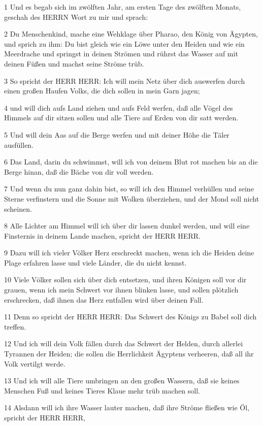 \par 1 Und es begab sich im zwölften Jahr, am ersten Tage des zwölften Monats, geschah des HERRN Wort zu mir und sprach:
\par 2 Du Menschenkind, mache eine Wehklage über Pharao, den König von Ägypten, und sprich zu ihm: Du bist gleich wie ein Löwe unter den Heiden und wie ein Meerdrache und springst in deinen Strömen und rührst das Wasser auf mit deinen Füßen und machst seine Ströme trüb.
\par 3 So spricht der HERR HERR: Ich will mein Netz über dich auswerfen durch einen großen Haufen Volks, die dich sollen in mein Garn jagen;
\par 4 und will dich aufs Land ziehen und aufs Feld werfen, daß alle Vögel des Himmels auf dir sitzen sollen und alle Tiere auf Erden von dir satt werden.
\par 5 Und will dein Aas auf die Berge werfen und mit deiner Höhe die Täler ausfüllen.
\par 6 Das Land, darin du schwimmst, will ich von deinem Blut rot machen bis an die Berge hinan, daß die Bäche von dir voll werden.
\par 7 Und wenn du nun ganz dahin bist, so will ich den Himmel verhüllen und seine Sterne verfinstern und die Sonne mit Wolken überziehen, und der Mond soll nicht scheinen.
\par 8 Alle Lichter am Himmel will ich über dir lassen dunkel werden, und will eine Finsternis in deinem Lande machen, spricht der HERR HERR.
\par 9 Dazu will ich vieler Völker Herz erschreckt machen, wenn ich die Heiden deine Plage erfahren lasse und viele Länder, die du nicht kennst.
\par 10 Viele Völker sollen sich über dich entsetzen, und ihren Königen soll vor dir grauen, wenn ich mein Schwert vor ihnen blinken lasse, und sollen plötzlich erschrecken, daß ihnen das Herz entfallen wird über deinen Fall.
\par 11 Denn so spricht der HERR HERR: Das Schwert des Königs zu Babel soll dich treffen.
\par 12 Und ich will dein Volk fällen durch das Schwert der Helden, durch allerlei Tyrannen der Heiden; die sollen die Herrlichkeit Ägyptens verheeren, daß all ihr Volk vertilgt werde.
\par 13 Und ich will alle Tiere umbringen an den großen Wassern, daß sie keines Menschen Fuß und keines Tieres Klaue mehr trüb machen soll.
\par 14 Alsdann will ich ihre Wasser lauter machen, daß ihre Ströme fließen wie Öl, spricht der HERR HERR,
